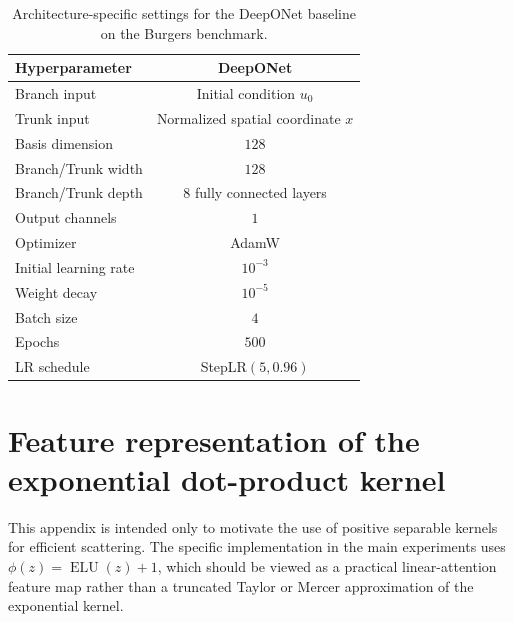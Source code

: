 \documentclass{article}
\newcommand{\ELU}{\operatorname{ELU}}
\begin{document}
\begin{table}[htbp]
\centering
\caption{Architecture-specific settings for the DeepONet baseline on the Burgers benchmark.}
\label{tab:app-baseline-settings}
\small
\setlength{\tabcolsep}{8pt}
\begin{tabular}{lc}
\toprule
\textbf{Hyperparameter} & \textbf{DeepONet} \\
\midrule
Branch input & Initial condition $u_0$ \\
Trunk input & Normalized spatial coordinate $x$ \\
Basis dimension & $128$ \\
Branch/Trunk width & $128$ \\
Branch/Trunk depth & $8$ fully connected layers \\
Output channels & $1$ \\
Optimizer & AdamW \\
Initial learning rate & $10^{-3}$ \\
Weight decay & $10^{-5}$ \\
Batch size & $4$ \\
Epochs & $500$ \\
LR schedule & StepLR$(5,0.96)$ \\
\bottomrule
\end{tabular}
\end{table}

\section{Feature representation of the exponential dot-product kernel}
\label{app:exp-kernel-feature}

This appendix is intended only to motivate the use of positive separable kernels for efficient scattering. The specific implementation in the main experiments uses $\phi(z)=\ELU(z)+1$, which should be viewed as a practical 
linear-attention feature map rather than a truncated Taylor or Mercer approximation of the exponential kernel.
\end{document}

